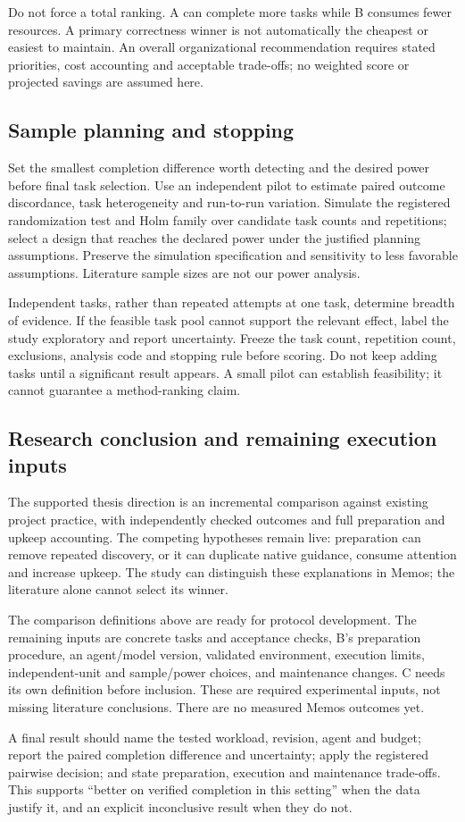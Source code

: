 Do not force a total ranking. A can complete more tasks while B consumes fewer
resources. A primary correctness winner is not automatically the cheapest or
easiest to maintain. An overall organizational recommendation requires stated
priorities, cost accounting and acceptable trade-offs; no weighted score or
projected savings are assumed here.

\subsection{Sample planning and stopping}
Set the smallest completion difference worth detecting and the desired power
before final task selection. Use an independent pilot to estimate paired
outcome discordance, task heterogeneity and run-to-run variation. Simulate the
registered randomization test and Holm family over candidate task counts and
repetitions; select a design that reaches the declared power under the justified
planning assumptions. Preserve the simulation specification and sensitivity to
less favorable assumptions. Literature sample sizes are not our power analysis.

Independent tasks, rather than repeated attempts at one task, determine breadth
of evidence. If the feasible task pool cannot support the relevant effect, label
the study exploratory and report uncertainty. Freeze the task count, repetition
count, exclusions, analysis code and stopping rule before scoring. Do not keep
adding tasks until a significant result appears. A small pilot can establish
feasibility; it cannot guarantee a method-ranking claim.

\subsection{Research conclusion and remaining execution inputs}
The supported thesis direction is an incremental comparison against existing
project practice, with independently checked outcomes and full preparation and
upkeep accounting. The competing hypotheses remain live: preparation can remove
repeated discovery, or it can duplicate native guidance, consume attention and
increase upkeep. The study can distinguish these explanations in Memos; the
literature alone cannot select its winner.

The comparison definitions above are ready for protocol development. The
remaining inputs are concrete tasks and acceptance checks, B's preparation
procedure, an agent/model version, validated environment, execution limits,
independent-unit and sample/power choices, and maintenance changes. C needs its
own definition before inclusion. These are required experimental inputs, not
missing literature conclusions. There are no measured Memos outcomes yet.

A final result should name the tested workload, revision, agent and budget;
report the paired completion difference and uncertainty; apply the registered
pairwise decision; and state preparation, execution and maintenance trade-offs.
This supports ``better on verified completion in this setting'' when the data
justify it, and an explicit inconclusive result when they do not.
